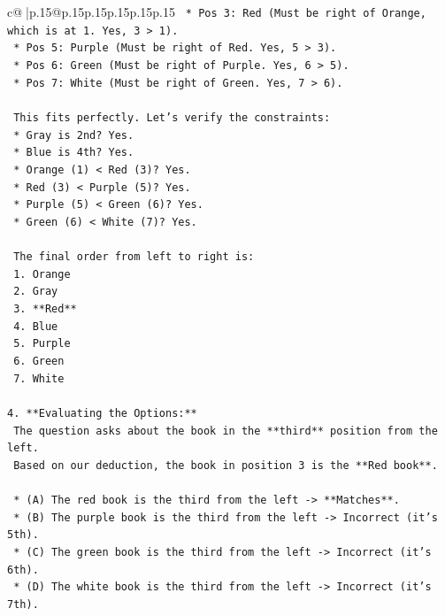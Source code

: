 \documentclass{article}
\begin{document}
{\begin{supertabular}{c@{$\;$}|p{.15\linewidth}@{}p{.15\linewidth}p{.15\linewidth}p{.15\linewidth}p{.15\linewidth}p{.15\linewidth}}
{{{\texttt{        *   Pos 3: Red (Must be right of Orange, which is at 1. Yes, 3 > 1).} \\
\texttt{        *   Pos 5: Purple (Must be right of Red. Yes, 5 > 3).} \\
\texttt{        *   Pos 6: Green (Must be right of Purple. Yes, 6 > 5).} \\
\texttt{        *   Pos 7: White (Must be right of Green. Yes, 7 > 6).} \\
\\ 
\texttt{    This fits perfectly. Let's verify the constraints:} \\
\texttt{    *   Gray is 2nd? Yes.} \\
\texttt{    *   Blue is 4th? Yes.} \\
\texttt{    *   Orange (1) < Red (3)? Yes.} \\
\texttt{    *   Red (3) < Purple (5)? Yes.} \\
\texttt{    *   Purple (5) < Green (6)? Yes.} \\
\texttt{    *   Green (6) < White (7)? Yes.} \\
\\ 
\texttt{    The final order from left to right is:} \\
\texttt{    1.  Orange} \\
\texttt{    2.  Gray} \\
\texttt{    3.  **Red**} \\
\texttt{    4.  Blue} \\
\texttt{    5.  Purple} \\
\texttt{    6.  Green} \\
\texttt{    7.  White} \\
\\ 
\texttt{4.  **Evaluating the Options:**} \\
\texttt{    The question asks about the book in the **third** position from the left.} \\
\texttt{    Based on our deduction, the book in position 3 is the **Red book**.} \\
\\ 
\texttt{    *   (A) The red book is the third from the left {-}> **Matches**.} \\
\texttt{    *   (B) The purple book is the third from the left {-}> Incorrect (it's 5th).} \\
\texttt{    *   (C) The green book is the third from the left {-}> Incorrect (it's 6th).} \\
\texttt{    *   (D) The white book is the third from the left {-}> Incorrect (it's 7th).} \\
}}}
\end{supertabular}}
\end{document}
